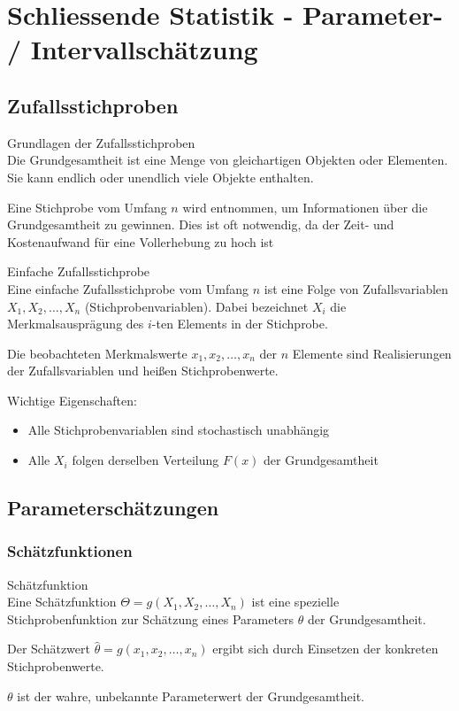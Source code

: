 \section{Schliessende Statistik - Parameter- / Intervallschätzung}

\subsection{Zufallsstichproben}

\begin{concept}{Grundlagen der Zufallsstichproben}\\
Die Grundgesamtheit ist eine Menge von gleichartigen Objekten oder Elementen. Sie kann endlich oder unendlich viele Objekte enthalten.

Eine Stichprobe vom Umfang $n$ wird entnommen, um Informationen über die Grundgesamtheit zu gewinnen. Dies ist oft notwendig, da der Zeit- und Kostenaufwand für eine Vollerhebung zu hoch ist
\end{concept}

\begin{definition}{Einfache Zufallsstichprobe}\\
Eine einfache Zufallsstichprobe vom Umfang $n$ ist eine Folge von Zufallsvariablen $X_1, X_2, \ldots, X_n$ (Stichprobenvariablen). Dabei bezeichnet $X_i$ die Merkmalsausprägung des $i$-ten Elements in der Stichprobe.

Die beobachteten Merkmalswerte $x_1, x_2, \ldots, x_n$ der $n$ Elemente sind Realisierungen der Zufallsvariablen und heißen Stichprobenwerte.

Wichtige Eigenschaften:
\begin{itemize}
  \item Alle Stichprobenvariablen sind stochastisch unabhängig
  \item Alle $X_i$ folgen derselben Verteilung $F(x)$ der Grundgesamtheit
\end{itemize}
\end{definition}

\subsection{Parameterschätzungen}

\subsubsection{Schätzfunktionen}

\begin{definition}{Schätzfunktion}\\
Eine Schätzfunktion $\Theta = g(X_1,X_2,\ldots,X_n)$ ist eine spezielle Stichprobenfunktion zur Schätzung eines Parameters $\theta$ der Grundgesamtheit.

Der Schätzwert $\hat{\theta} = g(x_1,x_2,\ldots,x_n)$ ergibt sich durch Einsetzen der konkreten Stichprobenwerte.

$\theta$ ist der wahre, unbekannte Parameterwert der Grundgesamtheit.
\end{definition}


